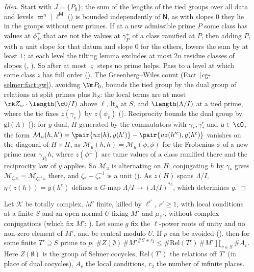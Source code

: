 \begin{proof}[Idea]
Start with $J=\{P_0\}$; the sum of the lengths of the tied groups over all data and levels
$\varpi^n\mid\ell^{\mathsf M}$ () is bounded independently of $\mathsf N$, as with
slopes $0$ they lie in the groups without new primes. If at a new admissible prime $P$ some class
has values at $\phi_P^\pm$ that are not the values at $\gamma_P^\pm$ of a class ramified at $P$, then
adding $P$, with a unit slope for that datum and slope $0$ for the others, lowers the sum by at
least $1$; at each level the tilting lemma excludes at most $2n$ residue classes of slopes
(, ). So after at most $\varsigma$
steps no prime helps. Pass to a level at which some class $z$ has full order
(). The Greenberg--Wiles count
(Fact~\ref{cg-selmer:fact:gw}), avoiding $\Nm P_0$, bounds the tied group by the dual group of
relations at split primes plus $\mathrm{lt}_S$: the local terms are at most $\rk Z_w\cdot\length(\cO/I)$
above $\ell$, $\mathrm{lt}_S$ at $S$, and $\length(\Lambda/I)$ at a tied prime, where the tie fixes
$z(\gamma_v)$ by $z(\phi_v)$ ().
Reciprocity bounds the dual group by $\mathrm{gl}(\Lambda)$
(): for $y$ dual, $H$ generated by the
commutators with $\gamma_*,\gamma_*^c$ and $u\in\cO$, the form
$\mathcal M_u(h,h')=\pair{uz(h),y(h')}-\pair{uz(h'^c),y(h^c)}$ vanishes on the diagonal of $H\times H$, as
$\mathcal M_u(h,h)=\mathcal M_u(\phi,\phi)$ for the Frobenius $\phi$ of a new prime near $\gamma_{P_0}h$, where
$z(\phi^\pm)$ are tame values of a class ramified there and the reciprocity law of $y$ applies. So
$\mathcal M_u$ is alternating on $H$; conjugating $h$ by $\gamma_*$ gives $\mathcal M_{\zeta_*u}=\mathcal M_{\zeta_*^{-1}u}$
there, and $\zeta_*-\zeta_*^{-1}$ is a unit (). As
$z(H)$ spans $\Lambda/I$, $\eta(z(h))=y(h^c)$ defines a $G$-map $\Lambda/I\to(\Lambda/I)^{*c}$, which determines $y$.
\end{proof}

\begin{fact}\label{cg-selmer:fact:gw}
Let $\mathcal K$ be totally complex, $M'$ finite, killed by $\ell^{r'}$, $r'\ge1$, with local conditions at a
finite $S$ and an open normal $U$ fixing $M'$ and $\mu_{\ell^{r'}}$, without complex conjugations
(which fix $M'$; ). Let some $g$ fix the $\ell$-power roots of unity
and no non-zero element of $M'$, and be central modulo $U$. If $p$ can be avoided
(), then for some finite $T'\supseteq S$ prime to $p$, $\#Z(\emptyset)\,\#M'^{\#S+r_2}\le\#\mathrm{Rel}(T')\,\#M'\prod_{v\in
S}\#A_v$. Here $Z(\emptyset)$ is the group of Selmer cocycles, $\mathrm{Rel}(T')$ the relations off
$T'$ (in place of dual cocycles), $A_v$ the local conditions, $r_2$ the number of infinite places.
\end{fact}

